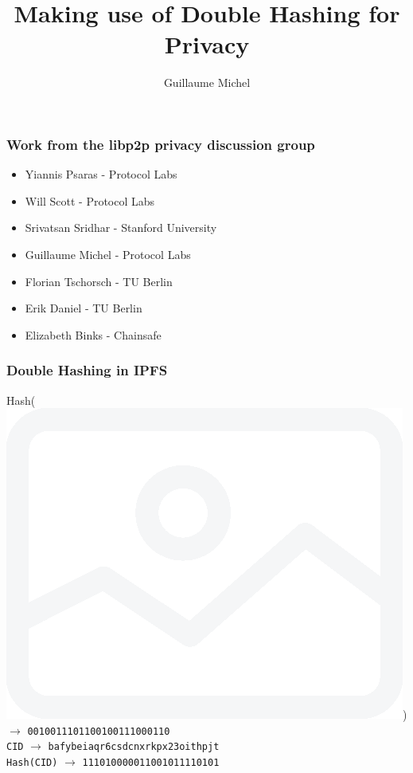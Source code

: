 \documentclass{pl-slide}
\title{Making use of Double Hashing for Privacy}
\author{Guillaume Michel}
\institute{Protocol Labs}
\date{\DTMdate{2022-07-14}}
\begin{document}
\frame{\titlepage}

\begin{frame}
\frametitle{Work from the libp2p privacy discussion group}
\begin{itemize}
	\item Yiannis Psaras - Protocol Labs
	\item Will Scott - Protocol Labs
	\item Srivatsan Sridhar - Stanford University
	\item Guillaume Michel - Protocol Labs
	\item Florian Tschorsch - TU Berlin
	\item Erik Daniel - TU Berlin
	\item Elizabeth Binks - Chainsafe
\end{itemize}
\end{frame}

\begin{frame}
\frametitle{Double Hashing in IPFS}

{\huge
Hash(\includegraphics[scale=0.06]{logos/image.png}) $\rightarrow$ \texttt{0010011101100100111000110}\\
\bigskip
\texttt{CID} $\rightarrow$ \texttt{bafybeiaqr6csdcnxrkpx23oithpjt}\\
\bigskip
\texttt{Hash(CID)} $\rightarrow$ \texttt{111010000011001011110101}
}
\end{frame}
\end{document}

